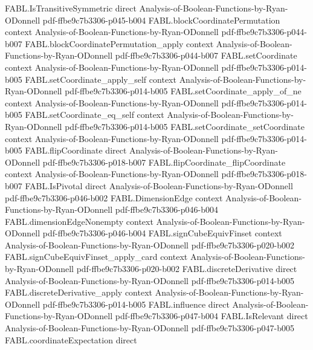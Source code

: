\begin{theorem}
  {FABL.IsTransitiveSymmetric}
  {direct}
  {Analysis-of-Boolean-Functions-by-Ryan-ODonnell}
  {pdf-ffbe9c7b3306-p045-b004}
\proofstep
  {FABL.blockCoordinatePermutation}
  {context}
  {Analysis-of-Boolean-Functions-by-Ryan-ODonnell}
  {pdf-ffbe9c7b3306-p044-b007}
\proofstep
  {FABL.blockCoordinatePermutation_apply}
  {context}
  {Analysis-of-Boolean-Functions-by-Ryan-ODonnell}
  {pdf-ffbe9c7b3306-p044-b007}
\proofstep
  {FABL.setCoordinate}
  {context}
  {Analysis-of-Boolean-Functions-by-Ryan-ODonnell}
  {pdf-ffbe9c7b3306-p014-b005}
\proofstep
  {FABL.setCoordinate_apply_self}
  {context}
  {Analysis-of-Boolean-Functions-by-Ryan-ODonnell}
  {pdf-ffbe9c7b3306-p014-b005}
\proofstep
  {FABL.setCoordinate_apply_of_ne}
  {context}
  {Analysis-of-Boolean-Functions-by-Ryan-ODonnell}
  {pdf-ffbe9c7b3306-p014-b005}
\proofstep
  {FABL.setCoordinate_eq_self}
  {context}
  {Analysis-of-Boolean-Functions-by-Ryan-ODonnell}
  {pdf-ffbe9c7b3306-p014-b005}
\proofstep
  {FABL.setCoordinate_setCoordinate}
  {context}
  {Analysis-of-Boolean-Functions-by-Ryan-ODonnell}
  {pdf-ffbe9c7b3306-p014-b005}
\proofstep
  {FABL.flipCoordinate}
  {direct}
  {Analysis-of-Boolean-Functions-by-Ryan-ODonnell}
  {pdf-ffbe9c7b3306-p018-b007}
\proofstep
  {FABL.flipCoordinate_flipCoordinate}
  {context}
  {Analysis-of-Boolean-Functions-by-Ryan-ODonnell}
  {pdf-ffbe9c7b3306-p018-b007}
\proofstep
  {FABL.IsPivotal}
  {direct}
  {Analysis-of-Boolean-Functions-by-Ryan-ODonnell}
  {pdf-ffbe9c7b3306-p046-b002}
\proofstep
  {FABL.DimensionEdge}
  {context}
  {Analysis-of-Boolean-Functions-by-Ryan-ODonnell}
  {pdf-ffbe9c7b3306-p046-b004}
\proofstep
  {FABL.dimensionEdgeNonempty}
  {context}
  {Analysis-of-Boolean-Functions-by-Ryan-ODonnell}
  {pdf-ffbe9c7b3306-p046-b004}
\proofstep
  {FABL.signCubeEquivFinset}
  {context}
  {Analysis-of-Boolean-Functions-by-Ryan-ODonnell}
  {pdf-ffbe9c7b3306-p020-b002}
\proofstep
  {FABL.signCubeEquivFinset_apply_card}
  {context}
  {Analysis-of-Boolean-Functions-by-Ryan-ODonnell}
  {pdf-ffbe9c7b3306-p020-b002}
\proofstep
  {FABL.discreteDerivative}
  {direct}
  {Analysis-of-Boolean-Functions-by-Ryan-ODonnell}
  {pdf-ffbe9c7b3306-p014-b005}
\proofstep
  {FABL.discreteDerivative_apply}
  {context}
  {Analysis-of-Boolean-Functions-by-Ryan-ODonnell}
  {pdf-ffbe9c7b3306-p014-b005}
\proofstep
  {FABL.influence}
  {direct}
  {Analysis-of-Boolean-Functions-by-Ryan-ODonnell}
  {pdf-ffbe9c7b3306-p047-b004}
\proofstep
  {FABL.IsRelevant}
  {direct}
  {Analysis-of-Boolean-Functions-by-Ryan-ODonnell}
  {pdf-ffbe9c7b3306-p047-b005}
\proofstep
  {FABL.coordinateExpectation}
  {direct}

\end{theorem}
